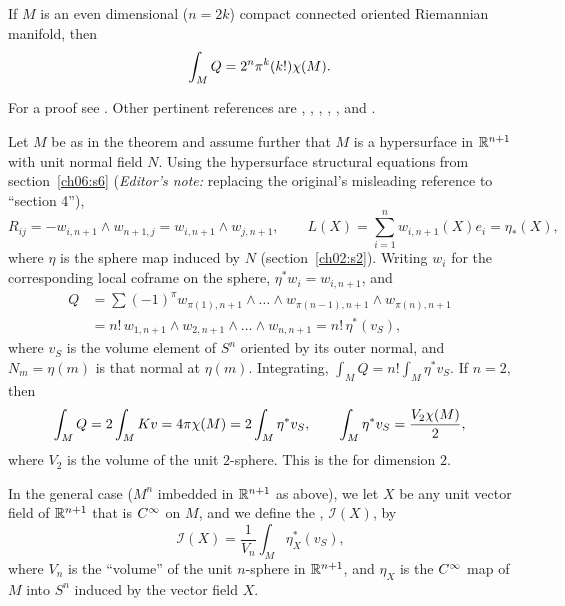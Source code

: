 \documentclass[../main]{subfiles}
\begin{document}
\begin{theorem} \label{thm:ch8.3.1}
    If $M$ is an even dimensional ($n=2 k$) compact connected oriented Riemannian manifold, then \[\int_M Q = 2^n \pi^k (k!) \chi(M).\]
\end{theorem}

For a proof see \cite{chern1951topics}. Other pertinent references are \cite{hopf1926uber}, \cite{Allendoerfer1940the}, \cite{Allendoerfer1943the}, \cite{fenchel1940on}, \cite{chern1945on}, and \cite{Allendoerfer1950the}.



Let $M$ be as in the theorem and assume further that $M$ is a hypersurface in $\mathbb{R}^{n+1}$ with unit normal field $N$. Using the hypersurface structural equations from section~\ref{ch06:s6} (\emph{Editor's note:} replacing the original's misleading reference to ``section 4''),
\[R_{ij}=-w_{i,n+1}\wedge w_{n+1,j}=w_{i,n+1}\wedge w_{j,n+1},\qquad L(X)=\sum_{i=1}^nw_{i,n+1}(X)e_i=\eta_\ast(X),\]
where $\eta$ is the sphere map induced by $N$ (section~\ref{ch02:s2}). Writing $w_i$ for the corresponding local coframe on the sphere, $\eta^\ast w_i=w_{i,n+1}$, and
\begin{align*}
    Q &= \sum (-1)^\pi w_{\pi(1), n+1} \wedge \dots \wedge w_{\pi(n-1), n+1} \wedge w_{\pi(n), n+1} \\
    &= n!\, w_{1, n+1} \wedge w_{2, n+1} \wedge \dots \wedge w_{n, n+1} = n!\, \eta^\ast(v_S)\text{,}
\end{align*}%
where $v_S$ is the volume element of $S^n$ oriented by its outer normal, and $N_m=\eta(m)$ is that normal at $\eta(m)$. Integrating, $\int_MQ=n!\int_M\eta^\ast v_S$. If $n=2$, then
\[\int_MQ=2\int_MKv=4\pi\chi(M)=2\int_M\eta^\ast v_S,\qquad
\int_M\eta^\ast v_S=\frac{V_2\chi(M)}2,\]
where $V_2$ is the volume of the unit $2$-sphere. This is the  for dimension $2$.

In the general case ($M^{n}$ imbedded in $\mathbb{R}^{n+1}$ as above), we let $X$ be any unit vector field of $\mathbb{R}^{n+1}$ that is $C^\infty$ on $M$, and we define the , $\mathcal{I}(X)$, by
\begin{equation}\tag{8}\label{eq:ch8.3.3}
    \mathcal{I}(X) = \frac{1}{V_n} \int_M \eta_X^\ast(v_S)\text{,}
\end{equation}%
where $V_n$ is the ``volume'' of the unit $n$-sphere in $\mathbb{R}^{n+1}$, and $\eta_X$ is the $C^\infty$ map of $M$ into $S^n$ induced by the vector field $X$.
\end{document}
